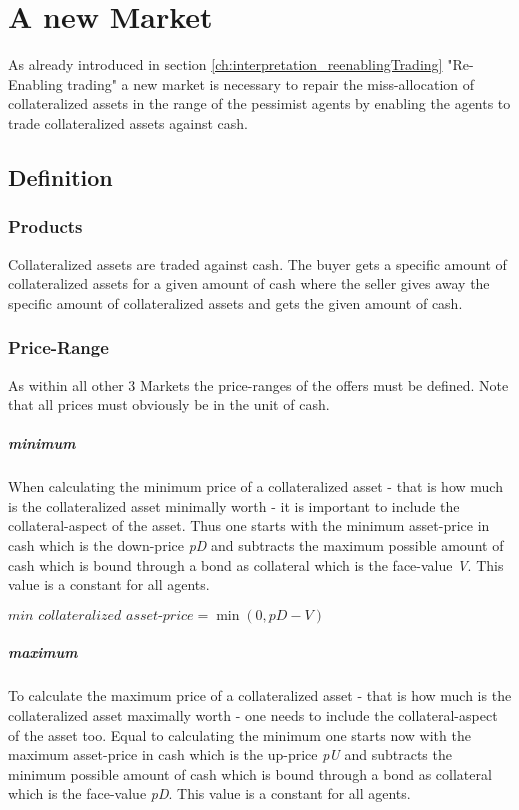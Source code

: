\documentclass[Bachelorarbeit.tex]{subfiles}
\begin{document}
\graphicspath{{./figures/newMarket/}}	%

\chapter{A new Market}
\label{ch:newMarket}
As already introduced in section \ref{ch:interpretation_reenablingTrading} "Re-Enabling trading" a new market is necessary to repair the miss-allocation of collateralized assets in the range of the pessimist agents by enabling the agents to trade collateralized assets against cash.

\section{Definition}
\subsection{Products}
Collateralized assets are traded against cash. The buyer gets a specific amount of collateralized assets for a given amount of cash where the seller gives away the specific amount of collateralized assets and gets the given amount of cash.

\subsection{Price-Range}
As within all other 3 Markets the price-ranges of the offers must be defined. Note that all prices must obviously be in the unit of cash.

\paragraph{minimum}
When calculating the minimum price of a collateralized asset - that is how much is the collateralized asset minimally worth - it is important to include the collateral-aspect of the asset. Thus one starts with the minimum asset-price in cash which is the down-price \textit{pD} and subtracts the maximum possible amount of cash which is bound through a bond as collateral which is the face-value \textit{V}. This value is a constant for all agents.

\begin{center}
$\textit{min collateralized asset-price} = \min(0, \textit{pD} - \textit{V})$
\end{center}
 
\paragraph{maximum}
To calculate the maximum price of a collateralized asset - that is how much is the collateralized asset maximally worth - one needs to include the collateral-aspect of the asset too. Equal to calculating the minimum one starts now with the maximum asset-price in cash which is the up-price \textit{pU} and subtracts the minimum possible amount of cash which is bound through a bond as collateral which is the face-value \textit{pD}. This value is a constant for all agents.
\end{document}
